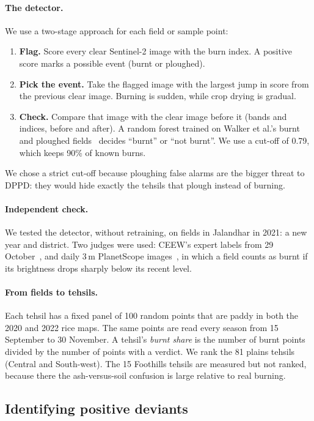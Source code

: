 \documentclass[sigconf,nonacm]{acmart}
\begin{document}
\paragraph{The detector.} We use a two-stage approach for each field or sample point:
\begin{enumerate}
  \item \textbf{Flag.} Score every clear Sentinel-2 image with the burn index. A positive score marks a possible event (burnt or ploughed).
  \item \textbf{Pick the event.} Take the flagged image with the largest jump in score from the previous clear image. Burning is sudden, while crop drying is gradual.
  \item \textbf{Check.} Compare that image with the clear image before it (bands and indices, before and after). A random forest trained on Walker et al.'s burnt and ploughed fields~\cite{walker2024data} decides ``burnt'' or ``not burnt''. We use a cut-off of 0.79, which keeps 90\% of known burns.
\end{enumerate}
We chose a strict cut-off because ploughing false alarms are the bigger threat to DPPD: they would hide exactly the tehsils that plough instead of burning.

\paragraph{Independent check.} We tested the detector, without retraining, on fields in Jalandhar in 2021: a new year and district. Two judges were used: CEEW's expert labels from 29 October~\cite{ceew2026patterns}, and daily 3\,m PlanetScope images~\cite{planet2026}, in which a field counts as burnt if its brightness drops sharply below its recent level.

\paragraph{From fields to tehsils.} Each tehsil has a fixed panel of 100 random points that are paddy in both the 2020 and 2022 rice maps. The same points are read every season from 15 September to 30 November. A tehsil's \emph{burnt share} is the number of burnt points divided by the number of points with a verdict. We rank the 81 plains tehsils (Central and South-west). The 15 Foothills tehsils are measured but not ranked, because there the ash-versus-soil confusion is large relative to real burning.

\subsection{Identifying positive deviants}
\label{sec:pd}
\end{document}
